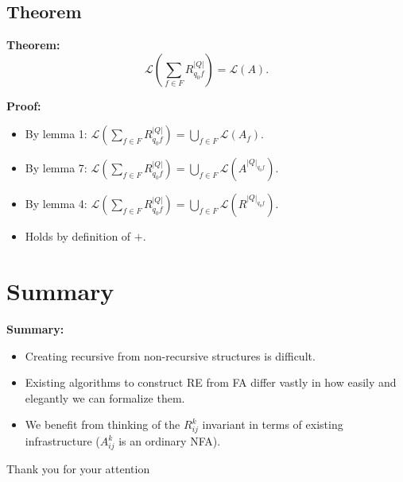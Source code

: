 \documentclass{beamer}
\begin{document}
\subsection*{Theorem}
\begin{frame}
    \textbf{Theorem:}
    \begin{equation*}
        \mathcal{L}(\sum_{f \in F} R^{|Q|}_{q_0 f}) = \mathcal{L}(A).
    \end{equation*}

    \textbf{Proof:}\\
    \begin{itemize}
        \item By lemma 1:
            $\mathcal{L}(\sum_{f \in F} R^{|Q|}_{q_0 f}) = \bigcup_{f \in F} \mathcal{L}(A_f).$
        \item By lemma 7:
            $\mathcal{L}(\sum_{f \in F} R^{|Q|}_{q_0 f}) = \bigcup_{f \in F} \mathcal{L}(A^{|Q|_{q_0 f}}).$
        \item By lemma 4: 
            $\mathcal{L}(\sum_{f \in F} R^{|Q|}_{q_0 f}) = \bigcup_{f \in F} \mathcal{L}(R^{|Q|_{q_0 f}}).$
        \item Holds by definition of $+$.
    \end{itemize}

\end{frame}

\section{Summary}
\begin{frame}
    \textbf{Summary:}
    \begin{itemize}
        \item
            Creating recursive from non-recursive structures is difficult.
        \item 
            Existing algorithms to construct RE from FA differ vastly in how easily and elegantly we can formalize them.
        \item
            We benefit from thinking of the $R^k_{i j}$ invariant in terms of existing infrastructure ($A^k_{i j}$ is an ordinary NFA).
    \end{itemize}
\end{frame}

\begin{frame}
    \begin{center}
        \huge Thank you for your attention
    \end{center}
\end{frame}

%    
\end{document}
